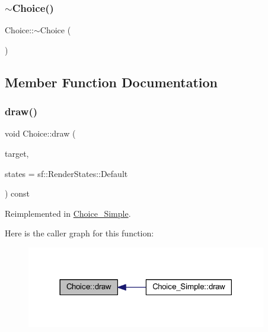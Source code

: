 \subsubsection{\texorpdfstring{$\sim$\+Choice()}{~Choice()}}
{\footnotesize\ttfamily Choice\+::$\sim$\+Choice (\begin{DoxyParamCaption}{ }\end{DoxyParamCaption})\hspace{0.3cm}{\ttfamily [virtual]}}



\subsection{Member Function Documentation}
\mbox{\label{class_choice_ad6a03ce8c892eacabef3691feba37b0f}} 
\subsubsection{\texorpdfstring{draw()}{draw()}}
{\footnotesize\ttfamily void Choice\+::draw (\begin{DoxyParamCaption}\item[{sf\+::\+Render\+Target \&}]{target,  }\item[{sf\+::\+Render\+States}]{states = {\ttfamily sf\+:\+:RenderStates\+:\+:Default} }\end{DoxyParamCaption}) const\hspace{0.3cm}{\ttfamily [virtual]}}



Reimplemented in \hyperlink{class_choice___simple_ae8f4cedc34a10d3c35efce8cec1bec54}{Choice\+\_\+\+Simple}.

Here is the caller graph for this function\+:\nopagebreak
\begin{figure}[H]
\begin{center}
\leavevmode
\includegraphics[width=297pt]{class_choice_ad6a03ce8c892eacabef3691feba37b0f_icgraph}
\end{center}
\end{figure}
\mbox{\label{class_choice_a8b901a892c521edcdb02c49c5bd057a8}} 
